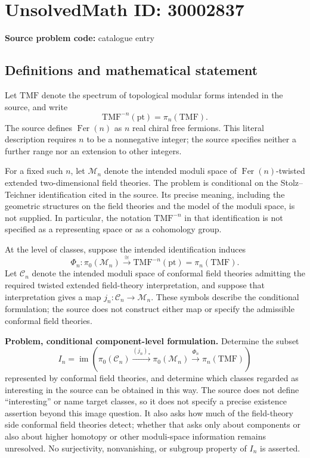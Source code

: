 \documentclass[11pt]{article}
\begin{document}
\section*{UnsolvedMath ID: 30002837}
\textbf{Source problem code:} catalogue entry
\subsection{Definitions and mathematical statement}
Let \(\mathrm{TMF}\) denote the spectrum of topological modular forms intended in the source, and write
\[
\mathrm{TMF}^{-n}(\mathrm{pt})=\pi_n(\mathrm{TMF}).
\]
The source defines \(\operatorname{Fer}(n)\) as \(n\) real chiral free fermions. This literal description requires \(n\) to be a nonnegative integer; the source specifies neither a further range nor an extension to other integers.

For a fixed such \(n\), let \(\mathcal M_n\) denote the intended moduli space of \(\operatorname{Fer}(n)\)-twisted extended two-dimensional field theories. The problem is conditional on the Stolz--Teichner identification cited in the source. Its precise meaning, including the geometric structures on the field theories and the model of the moduli space, is not supplied. In particular, the notation \(\mathrm{TMF}^{-n}\) in that identification is not specified as a representing space or as a cohomology group.

At the level of classes, suppose the intended identification induces
\[
\Phi_n:\pi_0(\mathcal M_n)\xrightarrow{\cong}
\mathrm{TMF}^{-n}(\mathrm{pt})=\pi_n(\mathrm{TMF}).
\]
Let \(\mathcal C_n\) denote the intended moduli space of conformal field theories admitting the required twisted extended field-theory interpretation, and suppose that interpretation gives a map \(j_n:\mathcal C_n\to\mathcal M_n\). These symbols describe the conditional formulation; the source does not construct either map or specify the admissible conformal field theories.

\textbf{Problem, conditional component-level formulation.} Determine the subset
\[
I_n=\operatorname{im}\!\left(
\pi_0(\mathcal C_n)\xrightarrow{(j_n)_*}
\pi_0(\mathcal M_n)\xrightarrow{\Phi_n}
\pi_n(\mathrm{TMF})
\right)
\]
represented by conformal field theories, and determine which classes regarded as interesting in the source can be obtained in this way. The source does not define ``interesting'' or name target classes, so it does not specify a precise existence assertion beyond this image question. It also asks how much of the field-theory side conformal field theories detect; whether that asks only about components or also about higher homotopy or other moduli-space information remains unresolved. No surjectivity, nonvanishing, or subgroup property of \(I_n\) is asserted.
\end{document}

